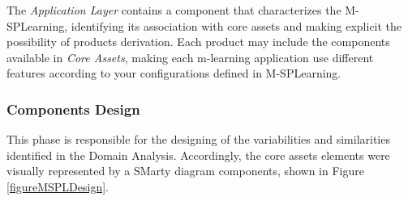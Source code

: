 The \textit{Application Layer} contains a component that characterizes the M-SPLearning, identifying its association with core assets and making explicit the possibility of products derivation. Each product may include the components available in \textit{Core Assets}, making each m-learning application use different features according to your configurations defined in M-SPLearning.


\subsubsection{Components Design}

This phase is responsible for the designing of the variabilities and similarities identified in the Domain Analysis. Accordingly, the core assets elements were visually represented by a SMarty diagram components, shown in Figure \ref{figureMSPLDesign}.

